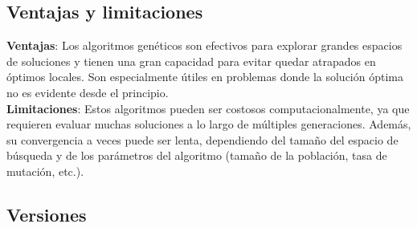 \subsection{Ventajas y limitaciones}\label{subsec:ventajas-y-limitaciones2}
\textbf{Ventajas}: Los algoritmos genéticos son efectivos para explorar grandes espacios de soluciones y tienen una
gran capacidad para evitar quedar atrapados en óptimos locales.
Son especialmente útiles en problemas donde la solución óptima no es evidente desde el principio. \\[6pt]

\textbf{Limitaciones}: Estos algoritmos pueden ser costosos computacionalmente, ya que requieren evaluar muchas
soluciones a lo largo de múltiples generaciones.
Además, su convergencia a veces puede ser lenta, dependiendo del tamaño del espacio de búsqueda y de los
parámetros del algoritmo (tamaño de la población, tasa de mutación, etc.).

\subsection{Versiones}\label{subsec:versiones}
